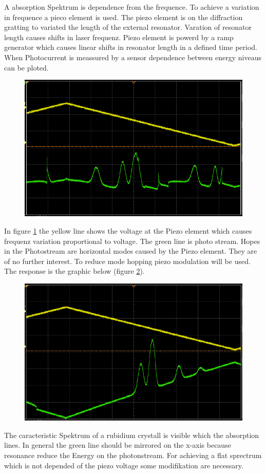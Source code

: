 A absorption Spektrum is dependence from the frequence. 
To achieve a variation in frequence a pieco element is used. 
The piezo element is on the diffraction gratting to variated the length of the
external resonator. 
Varation of resonator length causes shifts in laser frequenz. 
Piezo element is powerd by a ramp generator which causes linear shifts in
resonator length in a defined time period.
When Photocurrent is meassured by a sensor dependence between energy niveaus can
be ploted.
\begin{figure}[h]
		\centering
		\includegraphics[width=0.8\linewidth]{./content/pictures/scope_136.png}
		\caption{}
		\label{fig:piezotest}
\end{figure}
In figure \ref{fig:piezotest} the yellow line shows the voltage at the Piezo
element which causes frequenz variation proportional to voltage.
The green line is photo stream. 
Hopes in the Photostream are horizontal modes caused by the Piezo element.
They are of no further interest.
To reduce mode hopping piezo modulation will be used. 
The response is the graphic below (figure \ref{fig:rectangular}).
\begin{figure}[h]
		\centering
		\includegraphics[width=0.8\linewidth]{./content/pictures/scope_138.png}
		\caption{}
		\label{fig:rectangular}
\end{figure}
The caracteristic Spektrum of a rubidium crystall is visible which the
absorption lines. 
In general the green line should be mirrored on the x-axis because resonance
reduce the Energy on the photonstream. 
For achieving a flat sprectrum which is not depended of the piezo voltage some
modifikation are necessary.

